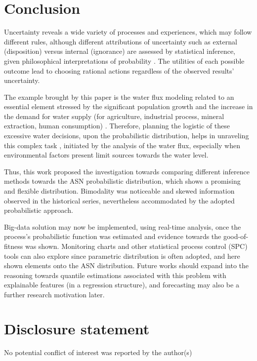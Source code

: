 \documentclass[]{interact}
\theoremstyle{plain}%
\theoremstyle{definition}
\theoremstyle{remark}
\begin{document}
\section{Conclusion}\label{conclusion}
Uncertainty reveals a wide variety of processes and experiences, which may follow different rules, although different attributions of uncertainty such as external (disposition) versus internal (ignorance) are assessed by statistical inference, given philosophical interpretations of probability \cite{kahneman1982variants}. The utilities of each possible outcome lead to choosing rational actions regardless of the observed results' uncertainty.

The example brought by this paper is the water flux modeling related to an essential element stressed by the significant population growth and the increase in the demand for water supply (for agriculture, industrial process, mineral extraction, human consumption) \cite{w13060824}. Therefore, planning the logistic of these excessive water decisions, upon the probabilistic distribution, helps in unraveling this complex task \cite{jain2002short,Tu2021}, initiated by the analysis of the water flux, especially when environmental factors present limit sources towards the water level.

Thus, this work proposed the investigation towards comparing different inference methods towards the ASN probabilistic distribution, which shows a promising and flexible distribution. Bimodality was noticeable and skewed information observed in the historical series, nevertheless accommodated by the adopted probabilistic approach.

Big-data solution may now be implemented, using real-time analysis, once the process's probabilistic function was estimated and evidence towards the good-of-fitness was shown. Monitoring charts and other statistical process control (SPC) tools can also explore since parametric distribution is often adopted, and here shown elements onto the ASN distribution. Future works should expand into the reasoning towards quantile estimations associated with this problem with explainable features (in a regression structure), and forecasting may also be a further research motivation later.

\section*{Disclosure statement}

No potential conflict of interest was reported by the author(s)
\end{document}
